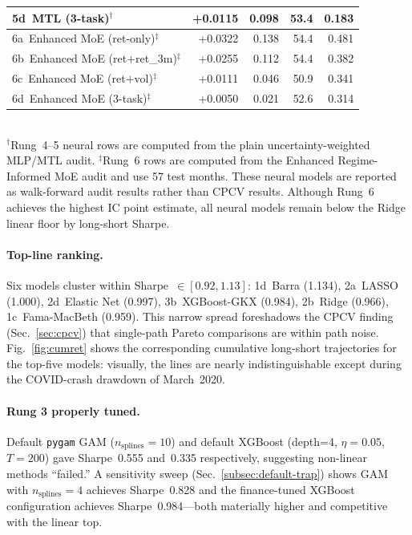 \documentclass[11pt]{article}
\begin{document}
\begin{table}[t]
\begin{tabular}{l r r r r}
5d~MTL (3-task)$^{\dagger}$                  & +0.0115 & 0.098 & 53.4 & 0.183 \\
\midrule
6a~Enhanced MoE (ret-only)$^{\ddagger}$      & +0.0322 & 0.138 & 54.4 & 0.481 \\
6b~Enhanced MoE (ret$+$ret\_3m)$^{\ddagger}$ & +0.0255 & 0.112 & 54.4 & 0.382 \\
6c~Enhanced MoE (ret$+$vol)$^{\ddagger}$     & +0.0111 & 0.046 & 50.9 & 0.341 \\
6d~Enhanced MoE (3-task)$^{\ddagger}$        & +0.0050 & 0.021 & 52.6 & 0.314 \\
\bottomrule
\end{tabular}
\\[2pt]
{\footnotesize $^{\dagger}$Rung~4--5 neural rows are computed from the
plain uncertainty-weighted MLP/MTL audit. $^{\ddagger}$Rung~6 rows are
computed from the Enhanced Regime-Informed MoE audit and use 57 test
months. These neural models are reported as walk-forward audit results
rather than CPCV results. Although Rung~6 achieves the highest IC point
estimate, all neural models remain below the Ridge linear floor by
long-short Sharpe.}
\end{table}

\paragraph{Top-line ranking.}
Six models cluster within Sharpe~$\in[0.92, 1.13]$:
1d~Barra (1.134), 2a~LASSO (1.000), 2d~Elastic Net (0.997),
3b~XGBoost-GKX (0.984), 2b~Ridge (0.966), 1c~Fama-MacBeth (0.959).
This narrow spread foreshadows the CPCV finding
(Sec.~\ref{sec:cpcv}) that single-path Pareto comparisons are within
path noise. Fig.~\ref{fig:cumret} shows the corresponding cumulative
long-short trajectories for the top-five models: visually, the lines
are nearly indistinguishable except during the COVID-crash drawdown
of March~2020.

\paragraph{Rung 3 properly tuned.}
Default \texttt{pygam} GAM ($n_{\text{splines}}{=}10$) and default
XGBoost (depth=4, $\eta{=}0.05$, $T{=}200$) gave Sharpe~0.555 and~0.335
respectively, suggesting non-linear methods ``failed.'' A sensitivity
sweep (Sec.~\ref{subsec:default-trap}) shows GAM with
$n_{\text{splines}}{=}4$ achieves Sharpe~0.828 and the
\citet{gu_kelly_xiu} finance-tuned XGBoost configuration achieves
Sharpe~0.984---both materially higher and competitive with the linear
top.
\end{document}

